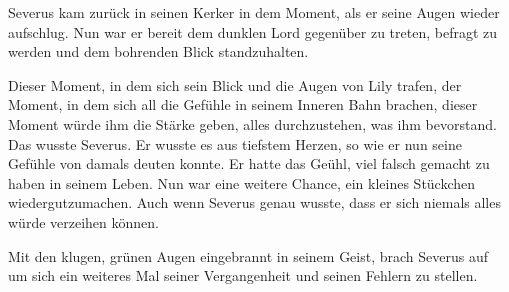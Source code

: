 \documentclass[fontsize=12pt]{scrartcl}
\begin{document}
	Severus kam zurück in seinen Kerker in dem Moment, als er seine Augen wieder aufschlug. Nun war er bereit dem dunklen Lord gegenüber zu treten, befragt zu werden und dem bohrenden Blick standzuhalten. 
	
	Dieser Moment, in dem sich sein Blick und die Augen von Lily trafen, der Moment, in dem sich all die Gefühle in seinem Inneren Bahn brachen, dieser Moment würde ihm die Stärke geben, alles durchzustehen, was ihm bevorstand. 
	Das wusste Severus. Er wusste es aus tiefstem Herzen, so wie er nun seine Gefühle von damals deuten konnte. Er hatte das Geühl, viel falsch gemacht zu haben in seinem Leben. Nun war eine weitere Chance, ein kleines Stückchen wiedergutzumachen. 
	Auch wenn Severus genau wusste, dass er sich niemals alles würde verzeihen können. 
	
	Mit den klugen, grünen Augen eingebrannt in seinem Geist, brach Severus auf um sich ein weiteres Mal seiner Vergangenheit und seinen Fehlern zu stellen. 
\end{document}
